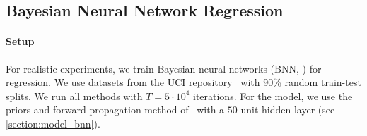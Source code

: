 
% 



  \vspace{-0.1in}
\subsection{Bayesian Neural Network Regression}\label{section:bnn}
  \vspace{-0.07in}
\paragraph{Setup}
For realistic experiments, we train Bayesian neural networks (BNN, \citealt{neal_bayesian_1996}) for regression.
We use datasets from the UCI repository~\citep{Dua:2019} with 90\% random train-test splits.
We run all methods with \(T=5\cdot10^4\) iterations.
For the model, we use the priors and forward propagation method of~\citet{pmlr-v37-hernandez-lobatoc15} with a \(50\)-unit hidden layer (see \cref{section:model_bnn}).

